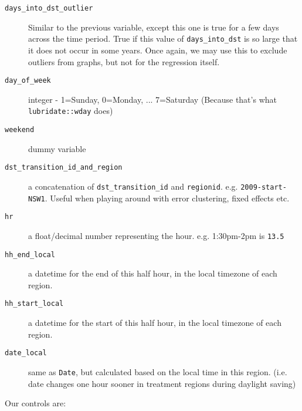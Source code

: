 \begin{description}
    \item[\texttt{days\_into\_dst\_outlier}] Similar to the previous variable, except this one is true for a few days across the time period. True if this value of \texttt{days\_into\_dst} is so large that it does not occur in some years. Once again, we may use this to exclude outliers from graphs, but not for the regression itself.
    \item[\texttt{day\_of\_week}] integer - 1=Sunday, 0=Monday, ... 7=Saturday (Because that's what \texttt{lubridate::wday} does)
    \item[\texttt{weekend}] dummy variable
    \item[\texttt{dst\_transition\_id\_and\_region}] a concatenation of \texttt{dst\_transition\_id} and \texttt{regionid}. e.g. \texttt{2009-start-NSW1}. Useful when playing around with error clustering, fixed effects etc.
    \item[\texttt{hr}] a float/decimal number representing the hour. e.g. 1:30pm-2pm is \texttt{13.5}
    \item[\texttt{hh\_end\_local}] a datetime for the end of this half hour, in the local timezone of each region.
    \item[\texttt{hh\_start\_local}] a datetime for the start of this half hour, in the local timezone of each region.
    \item[\texttt{date\_local}] same as \texttt{Date}, but calculated based on the local time in this region. (i.e. date changes one hour sooner in treatment regions during daylight saving)
\end{description}

Our controls are:

